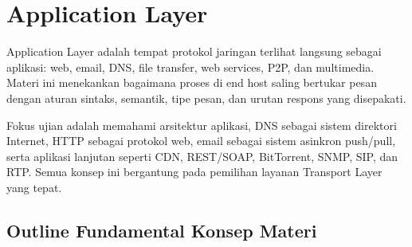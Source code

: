 \section{Application Layer}

Application Layer adalah tempat protokol jaringan terlihat langsung sebagai aplikasi: web, email, DNS, file transfer, web services, P2P, dan multimedia. Materi ini menekankan bagaimana proses di end host saling bertukar pesan dengan aturan sintaks, semantik, tipe pesan, dan urutan respons yang disepakati.

Fokus ujian adalah memahami arsitektur aplikasi, DNS sebagai sistem direktori Internet, HTTP sebagai protokol web, email sebagai sistem asinkron push/pull, serta aplikasi lanjutan seperti CDN, REST/SOAP, BitTorrent, SNMP, SIP, dan RTP. Semua konsep ini bergantung pada pemilihan layanan Transport Layer yang tepat.

\subsection{Outline Fundamental Konsep Materi}

